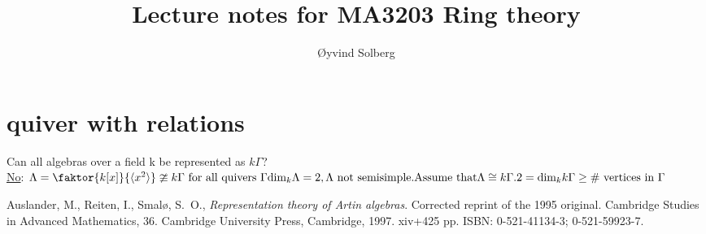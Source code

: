 \documentclass{amsart}
\numberwithin{equation}{section}
\theoremstyle{definition}
\newcommand{\G}{\Gamma}
\begin{document}
\title{Lecture notes for MA3203 Ring theory}

\author{\O yvind Solberg}
\address{Department of Mathematical Sciences\\
NTNU\\
N-7491 Trondheim, Norway}

\maketitle
\tableofcontents




	
\section{quiver with relations}
Can all algebras over a field k be represented as $k\G$?\\\newline
\underline{No}: 
$\Lambda = \faktor{k[x]}{\langle x^2\rangle} \ncong k\G \text{ for all quivers }\G
\text{dim}_{k}\Lambda = 2, \Lambda\text{ not semisimple}.\\\newline \text{Assume that}  \Lambda \cong k\G.\\
2= \text{dim}_kk\G \ge \text{\# vertices in } \G $





\printindex
\begin{thebibliography}{ARS}
 Auslander, M., Reiten, I., Smal\o, S.\ O.,
  \emph{Representation theory of Artin algebras}. Corrected reprint of
  the 1995 original. Cambridge Studies in Advanced Mathematics,
  36. Cambridge University Press, Cambridge, 1997. xiv+425 pp. ISBN:
  0-521-41134-3; 0-521-59923-7.
\end{thebibliography}
\end{document}
